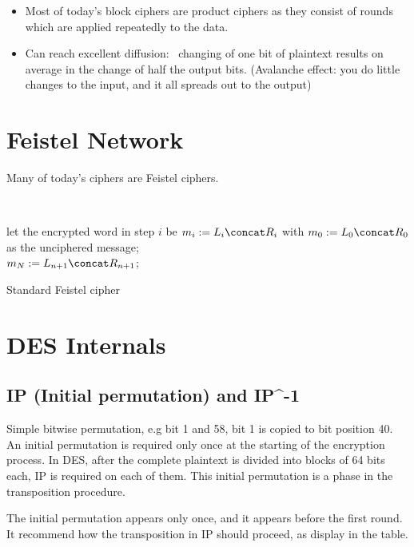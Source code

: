 \documentclass[twoside, twocolumn]{article}
\begin{document}
\begin{itemize}
    \item
Most of today's block ciphers are product ciphers as they consist of rounds which are applied repeatedly to the data. 
\item
Can reach excellent diffusion: \ changing of one bit of plaintext results on average in the change of half the output bits. (Avalanche effect: you do little changes to the input, and it all spreads out to the output)
\end{itemize}

\section{Feistel Network}
Many of today's ciphers are Feistel ciphers.

\

\begin{algorithm}
    let the encrypted word in step $i$ be $m_i := L_i \concat R_i$ with $m_0 := L_0 \concat R_0$ as the unciphered message; \\
    $m_N := L_{n+1} \concat R_{n+1}$; \\
    \caption{Standard Feistel cipher}
    \label{algo:feistel}
\end{algorithm}


\section{DES Internals}
\subsection{IP (Initial permutation) and IP^{-1}}
Simple bitwise permutation, e.g bit 1 and 58, bit 1 is copied to bit position 40. An initial permutation is required only once at the starting of the encryption process. In DES, after the complete plaintext is divided into blocks of 64 bits each, IP is required on each of them. This initial permutation is a phase in the transposition procedure.

The initial permutation appears only once, and it appears before the first round. It recommend how the transposition in IP should proceed, as display in the table.
\end{document}
